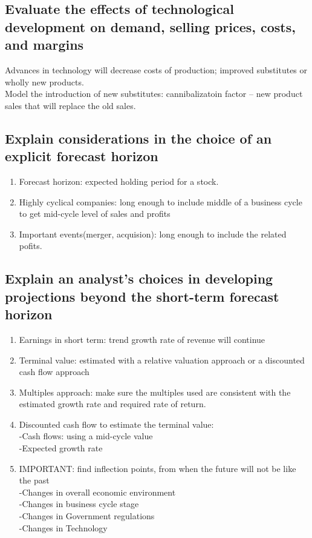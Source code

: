 \documentclass{article}
\newcommand{\be}{\begin{enumerate}}
\newcommand{\ee}{\end{enumerate}}
\begin{document}
\subsection{Evaluate the effects of technological development on demand, selling prices, costs, and margins}
Advances in technology will decrease costs of production; improved substitutes
or wholly new products.
\\Model the introduction of new substitutes: cannibalizatoin factor -- new product sales
that will replace the old sales.
\subsection{Explain considerations in the choice of an explicit forecast horizon}
\be
    \item Forecast horizon: expected holding period for a stock.
    \item Highly cyclical companies: long enough to include middle of a business cycle
        to get mid-cycle level of sales and profits
    \item Important events(merger, acquision): long enough to include the related pofits.
\ee
\subsection{Explain an analyst's choices in developing projections beyond the
short-term forecast horizon}
\be
    \item Earnings in short term: trend growth rate of revenue will continue
    \item Terminal value: estimated with a relative valuation approach or a discounted cash flow approach
    \item Multiples approach: make sure the multiples used are consistent with the estimated growth rate
        and required rate of return.
    \item Discounted cash flow to estimate the terminal value:
        \\-Cash flows: using a mid-cycle value
        \\-Expected growth rate
    \item IMPORTANT: find inflection points, from when the future will not be like
        the past
        \\-Changes in overall economic environment
        \\-Changes in business cycle stage
        \\-Changes in Government regulations
        \\-Changes in Technology
\ee
\end{document}
